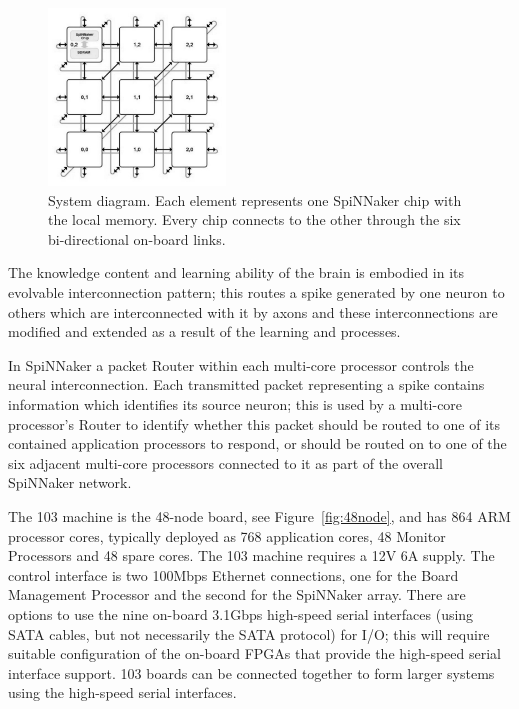 \documentclass[journal]{journal}
\begin{document}
\begin{figure}
\centering
	\includegraphics[width=0.42\textwidth]{pics/mesh_ctiff.jpg}
	\caption{System diagram.
	Each element represents one SpiNNaker chip with the local memory.
	Every chip connects to the other through the six bi-directional on-board links. }
	\label{fig:sysdia}
\end{figure}

The knowledge content and learning ability of the brain is embodied in its evolvable interconnection pattern; 
this routes a spike generated by one neuron to others which are interconnected with it by axons and these interconnections are modified and extended as a result of the learning and processes.

In SpiNNaker a packet Router within each multi-core processor controls the neural interconnection. 
Each transmitted packet representing a spike contains information which identifies its source neuron; 
this is used by a multi-core processor's Router to identify whether this packet should be routed to one of its contained application processors to respond, or should be routed on to one of the six adjacent multi-core processors connected to it as part of the overall SpiNNaker network.

The 103 machine is the 48-node board, see Figure~\ref{fig:48node}, and has 864 ARM processor cores, typically deployed as 768 application cores, 48 Monitor Processors and 48 spare cores. The 103 machine requires a 12V 6A supply. 
The control interface is two 100Mbps Ethernet connections, one for the Board Management Processor and the second for the SpiNNaker array. 
There are options to use the nine on-board 3.1Gbps high-speed serial interfaces (using SATA cables, but not necessarily the SATA protocol) for I/O; 
this will require suitable configuration of the on-board FPGAs that provide the high-speed serial interface support. 
103 boards can be connected together to form larger systems using the high-speed serial interfaces. 
\end{document}
